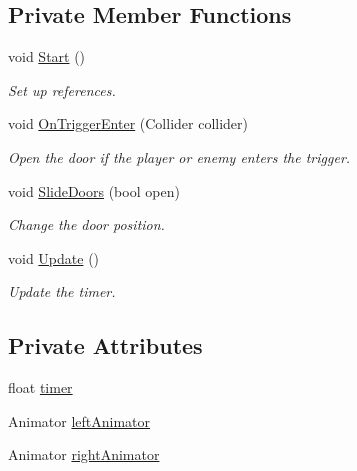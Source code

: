 \subsection*{Private Member Functions}
\begin{DoxyCompactItemize}
\item 
void \mbox{\hyperlink{class_side_sliding_door_script_add0ea5ab062d66897b2be108e88b37dc}{Start}} ()
\begin{DoxyCompactList}\small\item\em Set up references. \end{DoxyCompactList}\item 
void \mbox{\hyperlink{class_side_sliding_door_script_aebba10c4809594041c7095c9e73a68e0}{On\+Trigger\+Enter}} (Collider collider)
\begin{DoxyCompactList}\small\item\em Open the door if the player or enemy enters the trigger. \end{DoxyCompactList}\item 
void \mbox{\hyperlink{class_side_sliding_door_script_a9817dc2084b774cf5c85e93c28868123}{Slide\+Doors}} (bool open)
\begin{DoxyCompactList}\small\item\em Change the door position. \end{DoxyCompactList}\item 
void \mbox{\hyperlink{class_side_sliding_door_script_a03a51eb7ee28e8e5633067cd186f9408}{Update}} ()
\begin{DoxyCompactList}\small\item\em Update the timer. \end{DoxyCompactList}\end{DoxyCompactItemize}
\subsection*{Private Attributes}
\begin{DoxyCompactItemize}
\item 
float \mbox{\hyperlink{class_side_sliding_door_script_ab0a666162242a6024ebe7693b8d262ec}{timer}}
\item 
Animator \mbox{\hyperlink{class_side_sliding_door_script_a293e0fe03e804e1a22ef0ae228223d5b}{left\+Animator}}
\item 
Animator \mbox{\hyperlink{class_side_sliding_door_script_a59f9895f656195f1ec6c7f24153fbf92}{right\+Animator}}
\end{DoxyCompactItemize}


